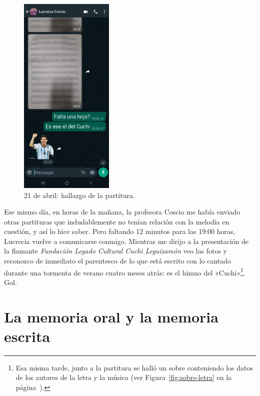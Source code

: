 \begin{figure}[htb]
\centering
\includegraphics[width=0.4\textwidth]{img/lucrecia1}
\caption{21 de abril: hallazgo de la partitura.}
\label{fig:hallazgo-partitura}
\end{figure}

\noindent Ese mismo día, en horas de la mañana, la profesora Coscio me había enviado otras partituras que indudablemente no tenían relación con la melodía en cuestión, y así lo hice saber. Pero faltando 12 minutos para las 19:00 horas, Lucrecia vuelve a comunicarse conmigo. Mientras me dirijo a la presentación de la flamante \emph{Fundación Legado Cultural Cuchi Leguizamón} veo las fotos y reconozco de inmediato el parentesco de lo que está escrito con lo cantado durante una tormenta de verano cuatro meses atrás: es el himno del «Cuchi»\footnote{Esa misma tarde, junto a la partitura se halló un sobre conteniendo los datos de los autores de la letra y la música (ver Figura~\ref{fig:sobre-letra} en la página~\pageref{fig:sobre-letra}).}. Gol.


\section{La memoria oral y la memoria escrita}
\label{sec:memoria-oral-escrita}



%
%
